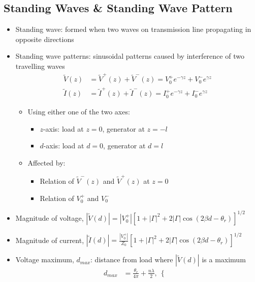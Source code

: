 \documentclass[a4paper]{article}
\begin{document}
\subsection{Standing Waves \& Standing Wave Pattern}
\begin{itemize}
    \item Standing wave: formed when two waves on transmission line propagating in opposite directions
    \item Standing wave patterns: sinusoidal patterns caused by interference of two travelling waves
    \begin{align*}
        \widetilde{V}(z) &= \widetilde{V}^+(z)+\widetilde{V}^-(z) = V_0^+e^{-\gamma z} + V_0^-e^{\gamma z}\\
        \widetilde{I}(z) &= \widetilde{I}^+(z)+\widetilde{I}^-(z) = I_0^+e^{-\gamma z} + I_0^-e^{\gamma z}
    \end{align*}
    \begin{itemize}[label=$\circ$]
        \item Using either one of the two axes:
        \begin{itemize}[label=\tiny$\blacksquare$]
            \item $z$-axis: load at $z=0$, generator at $z=-l$
            \item $d$-axis: load at $d=0$, generator at $d=l$
        \end{itemize}
        \item Affected by:
        \begin{itemize}[label=\tiny$\blacksquare$]
            \item Relation of $\widetilde{V}^-(z)$ and $\widetilde{V}^+(z)$ at $z=0$
            \item Relation of $V_0^+$ and $V_0^-$
        \end{itemize}
    \end{itemize}
    \item Magnitude of voltage, $|\widetilde{V}(d)|= |V_0^+|\left[1+|\Gamma|^2+2|\Gamma|\cos(2\beta d-\theta_r)\right]^{1/2}$
    \item Magnitude of current, $|\widetilde{I}(d)| = \displaystyle\frac{|V_0^+|}{Z_0}\left[1+|\Gamma|^2+2|\Gamma|\cos(2\beta d-\theta_r)\right]^{1/2}$
    \item Voltage maximum, $d_{max}$: distance from load where $|\widetilde{V}(d)|$ is a maximum
    \begin{align*}
        d_{max} &= \frac{\theta_r}{4\pi}+\frac{n\lambda}{2},\ \begin{cases}

\end{cases}
\end{align*}
\end{itemize}
\end{document}
